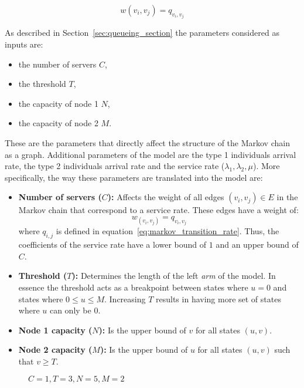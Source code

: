 \[
    w(v_i, v_j) = q_{v_i, v_j}
\]

As described in Section~\ref{sec:queueing_section} the parameters considered as
inputs are:

\begin{itemize}
    \item the number of servers \(C\),
    \item the threshold \(T\),
    \item the capacity of node 1 \(N\),
    \item the capacity of node 2 \(M\).
\end{itemize}

These are the parameters that directly affect the structure of the Markov chain
as a graph.
Additional parameters of the model are the type 1 individuals arrival rate,
the type 2 individuals arrival rate and the service rate (\(\lambda_1,
\lambda_2, \mu\)).
More specifically, the way these parameters are translated into the model are:

\begin{itemize}
    \item \textbf{Number of servers (\(C\)):} Affects the weight of all edges
    \((v_i, v_j) \in E\) in the Markov chain that correspond to a service rate.
    These edges have a weight of:
    \begin{equation*}
        w_{(v_i, v_j)} = q_{v_i, v_j}
    \end{equation*}
    where \(q_{i,j}\) is defined in equation~\eqref{eq:markov_transition_rate}.
    Thus, the coefficients of the service rate have a lower bound of \(1\) and
    an upper bound of \(C\).
    \item \textbf{Threshold (\(T\)):} Determines the length of the left
    \textit{arm} of the model.
    In essence the threshold acts as a breakpoint between states where \(u=0\)
    and states where \(0 \leq u \leq M\).
    Increasing \(T\) results in having more set of states where \(u\) can only
    be \(0\).
    \item \textbf{Node 1 capacity (\(N\)):} Is the upper bound of \(v\)
    for all  states \((u,v)\).
    \item \textbf{Node 2 capacity (\(M\)):} Is the upper bound of \(u\)
    for all states \((u,v)\) such that \(v \geq T\).
\end{itemize}


\begin{figure}[H]
    \centering
    \scalebox{0.7}{
        
        }
    \caption{\(C=1, T=3, N=5, M=2\)}
    \label{fig:Markov_1352_example_for_closed_form}
\end{figure}

